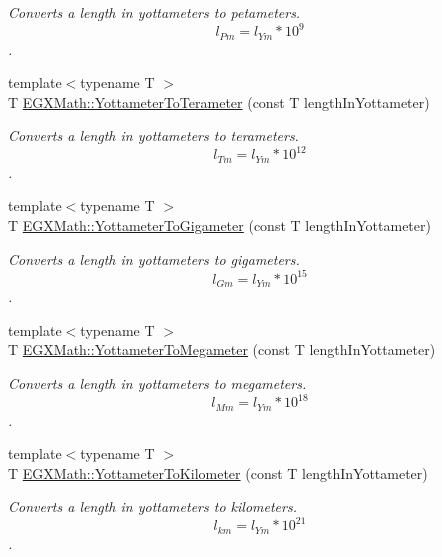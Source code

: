 \begin{DoxyCompactItemize}
\begin{DoxyCompactList}\small\item\em Converts a length in yottameters to petameters. \[ l_{Pm}=l_{Ym} * 10^{9} \]. \end{DoxyCompactList}\item 
{\footnotesize template$<$typename T $>$ }\\T \mbox{\hyperlink{group___e_g_x_math-_conversions-_length_conversions-_s_i-_yottameter-_s_i_ga24c70c7a3a5081e794d7cf4a37264b6c}{E\+G\+X\+Math\+::\+Yottameter\+To\+Terameter}} (const T length\+In\+Yottameter)
\begin{DoxyCompactList}\small\item\em Converts a length in yottameters to terameters. \[ l_{Tm}=l_{Ym} * 10^{12} \]. \end{DoxyCompactList}\item 
{\footnotesize template$<$typename T $>$ }\\T \mbox{\hyperlink{group___e_g_x_math-_conversions-_length_conversions-_s_i-_yottameter-_s_i_ga206834b7977e8b15c0fe06e279655c2b}{E\+G\+X\+Math\+::\+Yottameter\+To\+Gigameter}} (const T length\+In\+Yottameter)
\begin{DoxyCompactList}\small\item\em Converts a length in yottameters to gigameters. \[ l_{Gm}=l_{Ym} * 10^{15} \]. \end{DoxyCompactList}\item 
{\footnotesize template$<$typename T $>$ }\\T \mbox{\hyperlink{group___e_g_x_math-_conversions-_length_conversions-_s_i-_yottameter-_s_i_ga6c00035c9e60ba95c4670d34aef3ec2a}{E\+G\+X\+Math\+::\+Yottameter\+To\+Megameter}} (const T length\+In\+Yottameter)
\begin{DoxyCompactList}\small\item\em Converts a length in yottameters to megameters. \[ l_{Mm}=l_{Ym} * 10^{18} \]. \end{DoxyCompactList}\item 
{\footnotesize template$<$typename T $>$ }\\T \mbox{\hyperlink{group___e_g_x_math-_conversions-_length_conversions-_s_i-_yottameter-_s_i_ga3de441b3e33fe175b75425711d1b92e1}{E\+G\+X\+Math\+::\+Yottameter\+To\+Kilometer}} (const T length\+In\+Yottameter)
\begin{DoxyCompactList}\small\item\em Converts a length in yottameters to kilometers. \[ l_{km}=l_{Ym} * 10^{21} \]. \end{DoxyCompactList}\item 

\end{DoxyCompactItemize}
